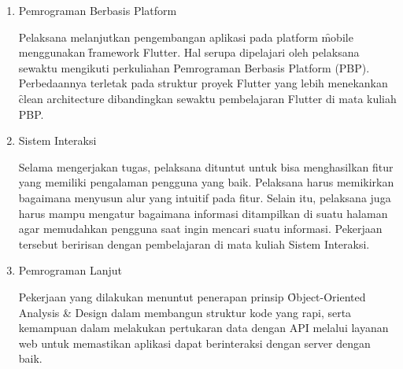 \begin{enumerate}
    \item Pemrograman Berbasis Platform
    
    Pelaksana melanjutkan pengembangan aplikasi pada platform \f{mobile}
    menggunakan \f{framework} Flutter. Hal serupa dipelajari oleh pelaksana
    sewaktu mengikuti perkuliahan Pemrograman Berbasis Platform (PBP).
    Perbedaannya terletak pada struktur proyek Flutter yang lebih menekankan
    \f{clean architecture} dibandingkan sewaktu pembelajaran Flutter di mata
    kuliah PBP.
    
    \item Sistem Interaksi
    
    Selama mengerjakan tugas, pelaksana dituntut untuk bisa menghasilkan fitur
    yang memiliki pengalaman pengguna yang baik. Pelaksana harus memikirkan
    bagaimana menyusun alur yang intuitif pada fitur. Selain itu, pelaksana juga
    harus mampu mengatur bagaimana informasi ditampilkan di suatu halaman agar
    memudahkan pengguna saat ingin mencari suatu informasi. Pekerjaan tersebut
    beririsan dengan pembelajaran di mata kuliah Sistem Interaksi.
    
    \item Pemrograman Lanjut
    
    Pekerjaan yang dilakukan menuntut penerapan prinsip \f{Object-Oriented
    Analysis \& Design} dalam membangun struktur kode yang rapi, serta kemampuan
    dalam melakukan pertukaran data dengan API melalui layanan web untuk
    memastikan aplikasi dapat berinteraksi dengan server dengan baik.
\end{enumerate}
